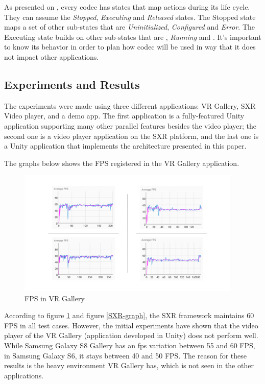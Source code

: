\documentclass[runningheads]{llncs}
\begin{document}
As presented on \cite{MediaCodec}, every codec has states that map actions during its life cycle. They can assume the \textit{Stopped}, \textit{Executing} and \textit{Released} states. The Stopped state maps a set of other sub-states that are \textit{Uninitialized}, \textit{Configured} and \textit{Error}. The Executing state builds on other sub-states that are , \textit{Running} and . It's important to know its behavior in order to plan how codec will be used in way that it does not impact other applications.


\subsection{Experiments and Results} \label{experiments}

The experiments were made using three different applications: VR Gallery, SXR Video player, and a demo app. The first application is a fully-featured Unity application supporting many other parallel features besides the video player; the second one is a video player application on the SXR platform, and the last one is a Unity application that implements the architecture presented in this paper.

The graphs below shows the FPS registered in the VR Gallery application.

\begin{figure}[h]
    \centering
    \includegraphics[width=\textwidth, height=6cm]{images/Gallery.png}
    \caption{FPS in VR Gallery}
    \label{gallery-graph}
\end{figure}

According to figure \ref{gallery-graph} and figure \ref{SXR-graph}, the SXR framework maintains 60 FPS in all test cases. However, the initial experiments have shown that the video player of the VR Gallery (application developed in Unity) does not perform well. While Samsung Galaxy S8 Gallery has an fps variation between 55 and 60 FPS, in Samsung Galaxy S6, it stays between 40 and 50 FPS. The reason for these results is the heavy environment VR Gallery has, which is not seen in the other applications.
\end{document}
